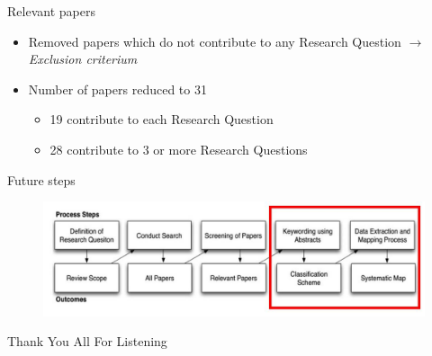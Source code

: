 \documentclass{beamer}
\begin{document}
\begin{frame}{Relevant papers}
\begin{itemize}
	\item Removed papers which do not contribute to any Research Question $\rightarrow$ \textit{Exclusion criterium}
	\item Number of papers reduced to 31
	\begin{itemize}
		\item 19 contribute to each Research Question
		\item 28 contribute to 3 or more Research Questions
	\end{itemize}
\end{itemize}

\end{frame}

\begin{frame}{Future steps}
\begin{figure}
	\includegraphics[width=1.0\textwidth]{sms_part_marked_2}
\end{figure}
\end{frame}

\begin{frame}
  
\end{frame}

\begin{frame}
\begin{center}
	\huge{Thank You All For Listening}
\end{center}
\end{frame}
\end{document}
